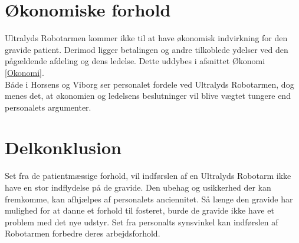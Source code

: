 \section{Økonomiske forhold}
Ultralyds Robotarmen kommer ikke til at have økonomisk indvirkning for den gravide patient. Derimod ligger betalingen og andre tilkoblede ydelser ved den pågældende afdeling og dens ledelse. Dette uddybes i afsnittet Økonomi \ref{Okonomi}. \\
Både i Horsens og Viborg ser personalet fordele ved Ultralyds Robotarmen, dog menes det, at økonomien og ledelsens beslutninger vil blive vægtet tungere end personalets argumenter.  
 
\section{Delkonklusion }
Set fra de patientmæssige forhold, vil indførslen af en Ultralyds Robotarm ikke have en stor indflydelse på de gravide. Den ubehag og usikkerhed der kan fremkomme, kan afhjælpes af personalets anciennitet. Så længe den gravide har mulighed for at danne et forhold til fosteret, burde de gravide ikke have et problem med det nye udstyr. 
Set fra personalts synsvinkel kan indførslen af Robotarmen forbedre deres arbejdsforhold. 